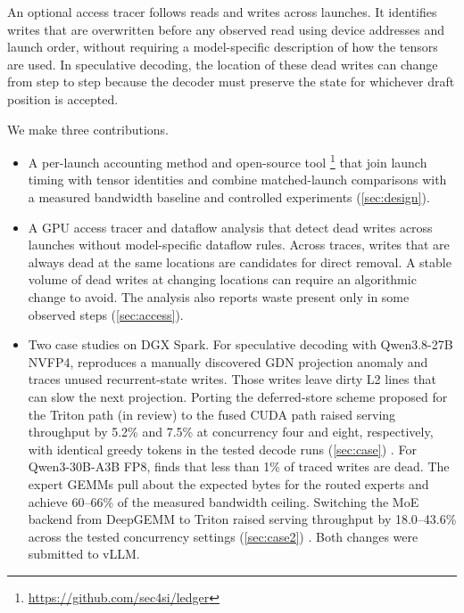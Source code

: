 An optional access tracer follows reads and writes across launches. It
identifies writes that are overwritten before any observed read using device
addresses and launch order, without requiring a model-specific description
of how the tensors are used. In speculative decoding, the location of
these dead writes can change from step to step because the decoder must
preserve the state for whichever draft position is accepted.

We make three contributions.

\begin{itemize}
  \item A per-launch accounting method and open-source tool%
    \footnote{\url{https://github.com/sec4si/ledger}} that join launch
    timing with tensor identities and combine matched-launch comparisons
    with a measured bandwidth baseline and controlled experiments
    (\cref{sec:design}).
  \item A GPU access tracer and dataflow analysis that detect dead
    writes across launches without model-specific dataflow rules.
    Across traces, writes that are always dead at the same locations
    are candidates for direct removal. A stable volume of dead writes
    at changing locations can require an algorithmic change to avoid.
    The analysis also reports waste present only in some observed
    steps (\cref{sec:access}).
  \item Two case studies on DGX Spark. For speculative decoding with
    Qwen3.8-27B NVFP4, \sys{} reproduces a manually discovered GDN
    projection anomaly and traces unused recurrent-state writes. Those
    writes leave dirty L2 lines that can slow the next projection.
    Porting the deferred-store scheme proposed for the Triton path (in review) to the fused CUDA path raised serving throughput by 5.2\% and 7.5\% at concurrency four
    and eight, respectively, with identical greedy tokens in the tested
    decode runs (\cref{sec:case}) \cite{vllmpr61434,vllmpr69160}.
    For Qwen3-30B-A3B FP8, \sys{} finds that less than 1\% of traced
    writes are dead.
    The expert GEMMs pull about the expected bytes for the routed experts
    and achieve 60--66\% of the measured bandwidth ceiling. Switching
    the MoE backend from DeepGEMM to Triton raised serving throughput by
    18.0--43.6\% across the tested concurrency settings (\cref{sec:case2})
    \cite{vllmpr69355}. Both changes were submitted to vLLM.
\end{itemize}
